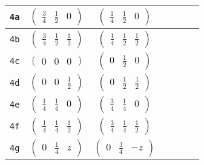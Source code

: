 \documentclass[fleqn,9pt,landscape]{jsarticle}
\begin{document}
\begin{center}
\begin{longtable}{ccccccc}
{\tt 4a} & $ \begin{pmatrix} \frac{3}{4} & \frac{1}{2} & 0 \end{pmatrix} $ & $ \begin{pmatrix} \frac{1}{4} & \frac{1}{2} & 0 \end{pmatrix} $ & $  $ & $  $ & $  $ & $  $ \\ \hline
{\tt 4b} & $ \begin{pmatrix} \frac{3}{4} & \frac{1}{2} & \frac{1}{2} \end{pmatrix} $ & $ \begin{pmatrix} \frac{1}{4} & \frac{1}{2} & \frac{1}{2} \end{pmatrix} $ & $  $ & $  $ & $  $ & $  $ \\ \hline
{\tt 4c} & $ \begin{pmatrix} 0 & 0 & 0 \end{pmatrix} $ & $ \begin{pmatrix} 0 & \frac{1}{2} & 0 \end{pmatrix} $ & $  $ & $  $ & $  $ & $  $ \\ \hline
{\tt 4d} & $ \begin{pmatrix} 0 & 0 & \frac{1}{2} \end{pmatrix} $ & $ \begin{pmatrix} 0 & \frac{1}{2} & \frac{1}{2} \end{pmatrix} $ & $  $ & $  $ & $  $ & $  $ \\ \hline
{\tt 4e} & $ \begin{pmatrix} \frac{1}{4} & \frac{1}{4} & 0 \end{pmatrix} $ & $ \begin{pmatrix} \frac{3}{4} & \frac{1}{4} & 0 \end{pmatrix} $ & $  $ & $  $ & $  $ & $  $ \\ \hline
{\tt 4f} & $ \begin{pmatrix} \frac{1}{4} & \frac{1}{4} & \frac{1}{2} \end{pmatrix} $ & $ \begin{pmatrix} \frac{3}{4} & \frac{1}{4} & \frac{1}{2} \end{pmatrix} $ & $  $ & $  $ & $  $ & $  $ \\ \hline
{\tt 4g} & $ \begin{pmatrix} 0 & \frac{1}{4} & z \end{pmatrix} $ & $ \begin{pmatrix} 0 & \frac{3}{4} & - z \end{pmatrix} $ & $  $ & $  $ & $  $ & $  $ \\ \hline

\end{longtable}
\end{center}
\end{document}

